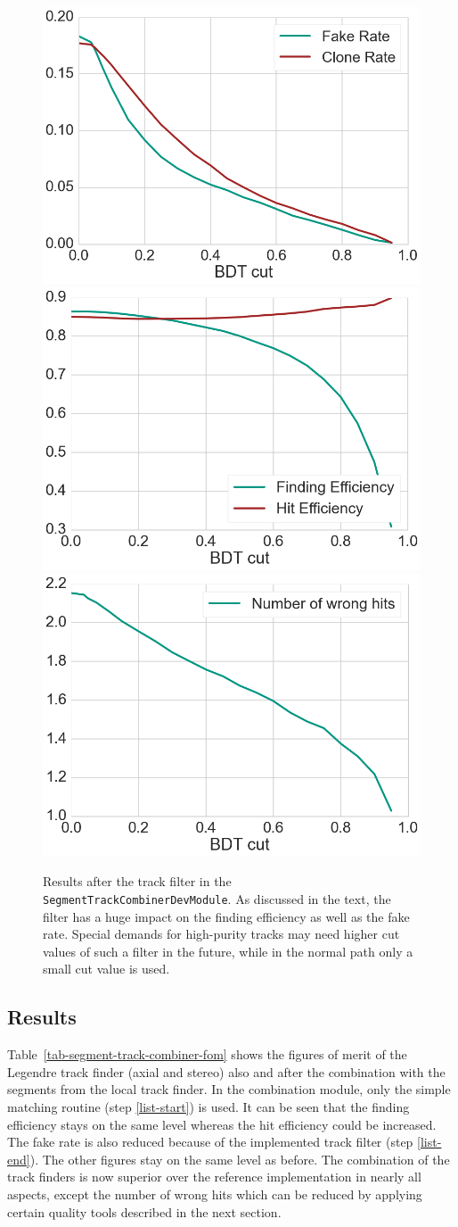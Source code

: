 \begin{figure}
  \centering
  \includegraphics[width=0.48\linewidth]{figures/workflow/track_filter_rate.png}
  \includegraphics[width=0.48\linewidth]{figures/workflow/track_filter_efficiency.png}
  \includegraphics[width=0.48\linewidth]{figures/workflow/track_filter_wrong_hits.png}
  \caption{Results after the track filter in the \texttt{SegmentTrackCombinerDevModule}. As discussed in the text, the filter has a huge impact on the finding efficiency as well as the fake rate. Special demands for high-purity tracks may need higher cut values of such a filter in the future, while in the normal path only a small cut value is used.}
  \label{fig-track-filter-results}
\end{figure}

\subsection{Results}

Table~\ref{tab-segment-track-combiner-fom} shows the figures of merit of the Legendre track finder (axial and stereo) also and after the combination with the segments from the local track finder. In the combination module, only the simple matching routine (step \ref{list-start}) is used. It can be seen that the finding efficiency stays on the same level whereas the hit efficiency could be increased. The fake rate is also reduced because of the implemented track filter (step \ref{list-end}). The other figures stay on the same level as before. The combination of the track finders is now superior over the reference implementation in nearly all aspects, except the number of wrong hits which can be reduced by applying certain quality tools described in the next section.

